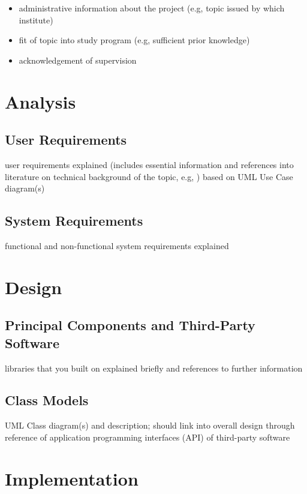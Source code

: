 \documentclass{book}
\begin{document}
\begin{itemize}
\item administrative information about the project (e.g, topic issued by which institute)
\item fit of topic into study program (e.g, sufficient prior knowledge)
\item acknowledgement of supervision
\end{itemize}

\chapter{Analysis} \label{ch:analysis}

\section{User Requirements}

user requirements explained (includes essential information and references into literature on technical background of the topic, e.g, \cite{Ries1522Rad}) based on UML Use Case diagram(s)

\section{System Requirements}

functional and non-functional system requirements explained

\chapter{Design} \label{ch:design}

\section{Principal Components and Third-Party Software}

libraries that you built on explained briefly and references to further information

\section{Class Models}

UML Class diagram(s) and description; should link into overall design through
reference of application programming interfaces (API) of third-party software

\chapter{Implementation} \label{ch:implementation}
\end{document}
